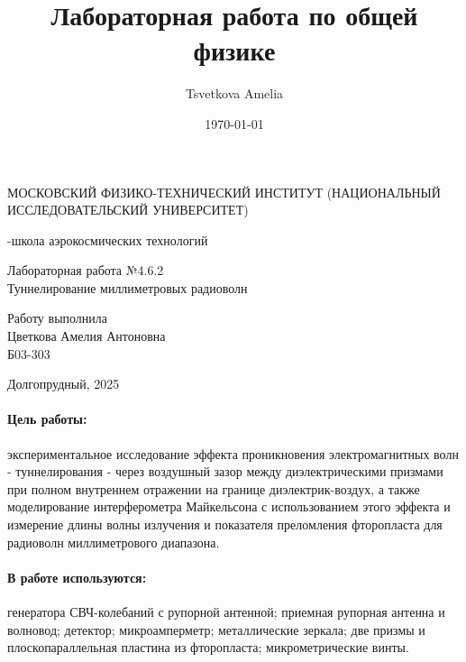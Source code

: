 \documentclass[a4paper,12pt]{article}
\author{Tsvetkova Amelia}
\title{Лабораторная работа по общей физике}
\date{\today}
\begin{document}
\begin{titlepage}
    \newpage
    \begin{center}
    {\large МОСКОВСКИЙ ФИЗИКО-ТЕХНИЧЕСКИЙ ИНСТИТУТ (НАЦИОНАЛЬНЫЙ ИССЛЕДОВАТЕЛЬСКИЙ УНИВЕРСИТЕТ)}
    \vspace{1cm}

    {-школа аэрокосмических технологий}
    \vspace{6em}
    \end{center}
    
    \vspace{1.2em}

    \begin{center}
    \Large Лабораторная работа №4.6.2 \\
    Туннелирование миллиметровых радиоволн
    \linebreak
    \end{center}
    
    \vspace{11em}
    
    \begin{flushright}
                       {\large Работу выполнила\\
                       Цветкова Амелия Антоновна\\
                       Б03-303 }
    \end{flushright}

    \vspace{\fill}

    \begin{center}
    Долгопрудный, 2025
    \end{center}

    \end{titlepage}

\paragraph{Цель работы:} экспериментальное исследование эффекта проникновения электромагнитных волн - туннелирования - через воздушный зазор между диэлектрическими призмами при полном внутреннем отражении на границе диэлектрик-воздух, а также моделирование интерферометра Майкельсона с использованием этого эффекта и измерение длины волны излучения и показателя преломления фторопласта для радиоволн миллиметрового диапазона.

\paragraph{В работе используются:} генератора СВЧ-колебаний с рупорной антенной; приемная рупорная антенна и волновод; детектор; микроамперметр; металлические зеркала; две призмы и плоскопараллельная пластина из фторопласта; микрометрические винты.
\end{document}
